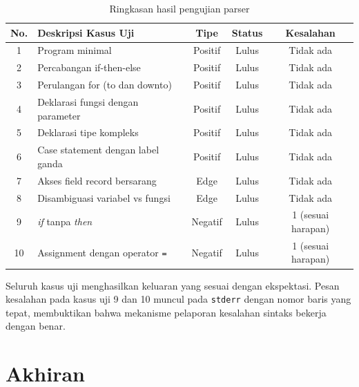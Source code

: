 \documentclass[12pt,a4paper]{article}
\begin{document}
\begin{table}[H]
  \centering
  \begin{tabular}{clccc}
    \toprule
    \textbf{No.} & \textbf{Deskripsi Kasus Uji} & \textbf{Tipe} & \textbf{Status} & \textbf{Kesalahan} \\
    \midrule
    1  & Program minimal                        & Positif & Lulus & Tidak ada \\
    2  & Percabangan if-then-else               & Positif & Lulus & Tidak ada \\
    3  & Perulangan for (to dan downto)         & Positif & Lulus & Tidak ada \\
    4  & Deklarasi fungsi dengan parameter      & Positif & Lulus & Tidak ada \\
    5  & Deklarasi tipe kompleks                & Positif & Lulus & Tidak ada \\
    6  & Case statement dengan label ganda      & Positif & Lulus & Tidak ada \\
    7  & Akses field record bersarang           & Edge    & Lulus & Tidak ada \\
    8  & Disambiguasi variabel vs fungsi        & Edge    & Lulus & Tidak ada \\
    9  & \textit{if} tanpa \textit{then}        & Negatif & Lulus & 1 (sesuai harapan) \\
    10 & Assignment dengan operator \texttt{=} & Negatif & Lulus & 1 (sesuai harapan) \\
    \bottomrule
  \end{tabular}
  \caption{Ringkasan hasil pengujian parser}
\end{table}

Seluruh kasus uji menghasilkan keluaran yang sesuai dengan ekspektasi. Pesan kesalahan pada kasus uji 9 dan 10 muncul pada \texttt{stderr} dengan nomor baris yang tepat, membuktikan bahwa mekanisme pelaporan kesalahan sintaks bekerja dengan benar.

\section{Akhiran}
\end{document}
